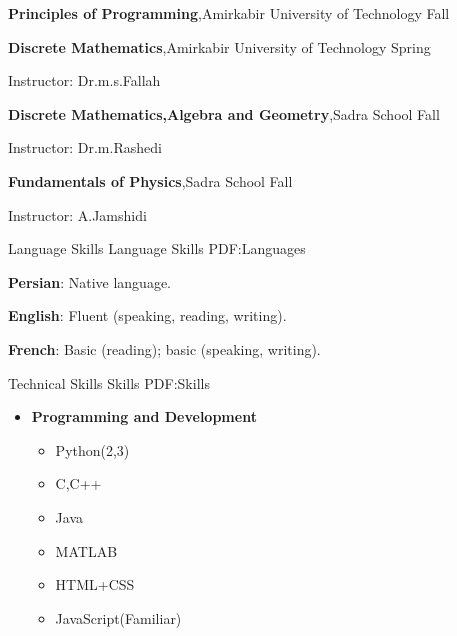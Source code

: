 \documentclass[letterpaper,MMMyyyy,nonstopmode]{simpleresumecv}
\begin{document}
\begin{Body}
\Entry
\textbf{Principles of Programming},Amirkabir University of Technology
\hfill
Fall 




\Entry
\textbf{Discrete Mathematics},Amirkabir University of Technology
\hfill
Spring 

\BulletItem
Instructor: Dr.m.s.Fallah


\Entry
\textbf{Discrete Mathematics,Algebra and Geometry},Sadra School
\hfill
Fall 

\BulletItem
Instructor: Dr.m.Rashedi



\Entry
\textbf{Fundamentals of Physics},Sadra School
\hfill
Fall 

\BulletItem
Instructor: A.Jamshidi









\Section
{Language Skills}
{Language Skills}
{PDF:Languages}

\BulletItem
\textbf{Persian}: Native language.

\Gap
\BulletItem
\textbf {English}: Fluent (speaking, reading, writing).

\Gap
\BulletItem
\textbf{French}: Basic (reading); basic (speaking, writing).


\Section
{Technical Skills}
{Skills}
{PDF:Skills}

\Entry

\begin{itemize}
\item \textbf {Programming and Development}
\begin{itemize}
    \item Python(2,3)
    \item C,C++
    \item Java
    \item MATLAB
    \item HTML+CSS
    \item JavaScript(Familiar)
\end{itemize}




\end{itemize}
\end{Body}
\end{document}

